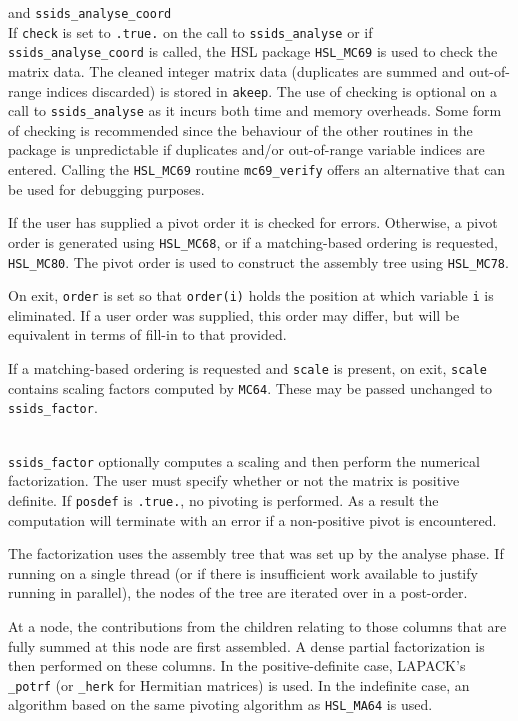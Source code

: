 \documentclass{spral}
\begin{document}
\vspace{0.2in}
 and {\tt ssids\_analyse\_coord} \\
If {\tt check} is set to {\tt .true.} on the call to {\tt ssids\_analyse}
or if {\tt ssids\_analyse\_coord} is called, the HSL package
{\tt HSL\_MC69} is used to check the matrix data. The cleaned integer matrix data
(duplicates are summed and out-of-range indices discarded) is stored in
{\tt akeep}.
The use of checking is optional on a call to {\tt ssids\_analyse} as it
incurs both time and memory overheads. Some form of checking is recommended
since the behaviour of the other routines in the package
is unpredictable if duplicates and/or out-of-range variable indices are entered.
Calling the \texttt{HSL\_MC69} routine \texttt{mc69\_verify} offers an
alternative that can be used for debugging purposes.

If the user has supplied a pivot order it is checked for errors. Otherwise,
a pivot order is generated using {\tt HSL\_MC68}, or if a matching-based ordering is
requested, {\tt HSL\_MC80}.
The pivot order is used to construct the assembly tree
using {\tt HSL\_MC78}.

On exit, {\tt order} is set so that {\tt order(i)} holds the position
at which variable {\tt i} is eliminated. If a user order was supplied, this
order may differ, but will be equivalent in terms of fill-in to that provided.


If a matching-based ordering is requested and {\tt scale} is present, on exit,
{\tt scale} contains scaling factors computed by {\tt MC64}.
These may be passed unchanged to {\tt ssids\_factor}.

\vspace{0.2in}
\\
{\tt ssids\_factor} optionally computes
a scaling and then perform the numerical factorization.
 The user must specify whether or not the matrix is
positive definite. If {\tt posdef} is {\tt .true.}, no pivoting
is performed. As a result the computation will terminate with an error if a
non-positive pivot is encountered.

The factorization uses the assembly tree that was set up by the analyse phase.
If running on a single thread (or if there is insufficient work available to
justify running in parallel), the nodes of the tree are iterated over in a
post-order.

At a node, the contributions from the children relating to those columns
that are fully summed at this node are first assembled. A dense partial
factorization is then performed on these columns. In the positive-definite case,
LAPACK's \texttt{\_potrf} (or \texttt{\_herk} for Hermitian matrices) is used.
In the indefinite case, an algorithm based on the same pivoting algorithm as
\texttt{HSL\_MA64} is used.
\end{document}
